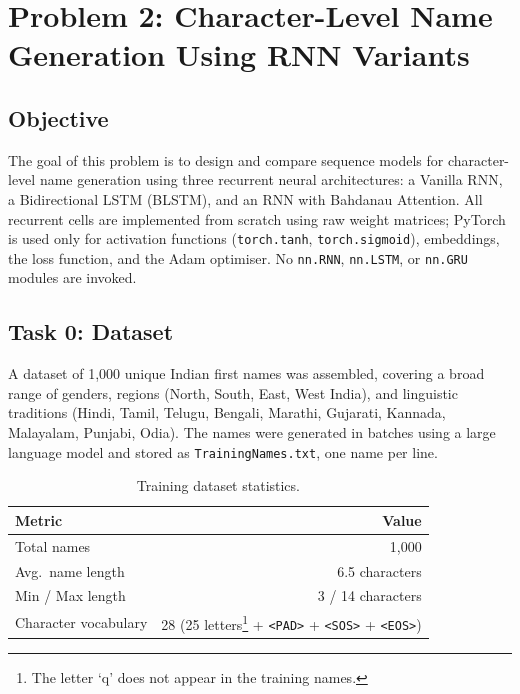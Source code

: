 \documentclass[12pt, a4paper]{article}
\begin{document}
\section{Problem 2: Character-Level Name Generation Using RNN Variants}

\subsection{Objective}

The goal of this problem is to design and compare sequence models for character-level name generation using three recurrent neural architectures: a Vanilla RNN, a Bidirectional LSTM (BLSTM), and an RNN with Bahdanau Attention. All recurrent cells are implemented from scratch using raw weight matrices; PyTorch is used only for activation functions (\texttt{torch.tanh}, \texttt{torch.sigmoid}), embeddings, the loss function, and the Adam optimiser. No \texttt{nn.RNN}, \texttt{nn.LSTM}, or \texttt{nn.GRU} modules are invoked.

\subsection{Task 0: Dataset}

A dataset of 1,000 unique Indian first names was assembled, covering a broad range of genders, regions (North, South, East, West India), and linguistic traditions (Hindi, Tamil, Telugu, Bengali, Marathi, Gujarati, Kannada, Malayalam, Punjabi, Odia). The names were generated in batches using a large language model and stored as \texttt{TrainingNames.txt}, one name per line.

\begin{table}[H]
\centering
\caption{Training dataset statistics.}
\label{tab:names_stats}
\begin{tabular}{lr}
\toprule
\textbf{Metric} & \textbf{Value} \\
\midrule
Total names          & 1,000 \\
Avg.\ name length    & 6.5 characters \\
Min / Max length     & 3 / 14 characters \\
Character vocabulary & 28 (25 letters\footnote{The letter `q' does not appear in the training names.} + \texttt{<PAD>} + \texttt{<SOS>} + \texttt{<EOS>}) \\
\bottomrule
\end{tabular}
\end{table}
\end{document}
